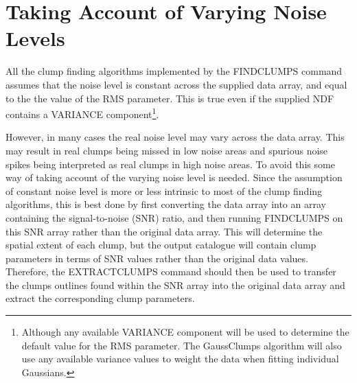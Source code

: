 \documentclass[twoside,11pt]{article}
\newcommand{\htmlref}[2]{#1}
\renewcommand{\_}{\texttt{\symbol{95}}}
\begin{document}
\section{Taking Account of Varying Noise Levels}

All the clump finding algorithms implemented by the
\htmlref{FINDCLUMPS}{FINDCLUMPS} command assumes that the noise level is
constant across the supplied data array, and equal to the the value of
the RMS parameter. This is true even if the supplied NDF contains a
VARIANCE component\footnote{Although any available VARIANCE component
will be used to determine the default value for the RMS parameter. The
GaussClumps algorithm will also use any available variance values to
weight the data when fitting individual Gaussians.}.

However, in many cases the real noise level may vary across the data
array. This may result in real clumps being missed in low noise areas and
spurious noise spikes being interpreted as real clumps in high noise
areas. To avoid this some way of taking account of the varying noise
level is needed. Since the assumption of constant noise level is more or
less intrinsic to most of the clump finding algorithms, this is best done
by first converting the data array into an array containing the
signal-to-noise (SNR) ratio, and then running FINDCLUMPS on this SNR array
rather than the original data array. This will determine the spatial
extent of each clump, but the output catalogue will contain clump
parameters in terms of SNR values rather than the original data values.
Therefore, the \htmlref{EXTRACTCLUMPS}{EXTRACTCLUMPS} command should then
be used to transfer the clumps outlines found within the SNR array into
the original data array and extract the corresponding clump parameters.
\end{document}
